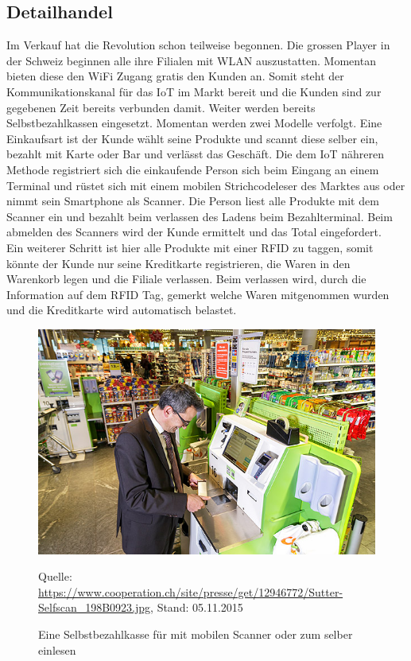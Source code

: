 \subsection{Detailhandel}
Im Verkauf hat die Revolution schon teilweise begonnen. Die grossen Player in der Schweiz beginnen alle ihre Filialen mit WLAN auszustatten. Momentan bieten diese den WiFi Zugang gratis den Kunden an. Somit steht der Kommunikationskanal für das IoT im Markt bereit und die Kunden sind zur gegebenen Zeit bereits verbunden damit.
Weiter werden bereits Selbstbezahlkassen eingesetzt. Momentan werden zwei Modelle verfolgt. Eine Einkaufsart ist der Kunde wählt seine Produkte und scannt diese selber ein, bezahlt mit Karte oder Bar und verlässt das Geschäft. Die dem IoT nähreren Methode registriert sich die einkaufende Person sich beim Eingang an einem Terminal und rüstet sich mit einem mobilen Strichcodeleser des Marktes aus oder nimmt sein Smartphone als Scanner. Die Person liest alle Produkte mit dem Scanner ein und bezahlt beim verlassen des Ladens beim Bezahlterminal. Beim abmelden des Scanners wird der Kunde ermittelt und das Total eingefordert.\\
Ein weiterer Schritt ist hier alle Produkte mit einer RFID zu taggen, somit könnte der Kunde nur seine Kreditkarte registrieren, die Waren in den Warenkorb legen und die Filiale verlassen. Beim verlassen wird, durch die Information auf dem RFID Tag, gemerkt welche Waren mitgenommen wurden und die Kreditkarte wird automatisch belastet.
\begin{figure}[H]
  \centering
  \includegraphics[scale=0.81]{98_Bilder/03_Marktsegmente/self_checkout}
  \caption[Self Checkout Kasse]{Eine Selbstbezahlkasse für mit mobilen Scanner oder zum selber einlesen}
  \footnotesize Quelle: \url{https://www.cooperation.ch/site/presse/get/12946772/Sutter-Selfscan_198B0923.jpg}, Stand: 05.11.2015
\end{figure}

